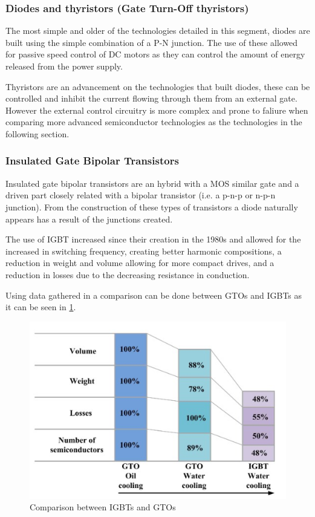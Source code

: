 \subsubsection{Diodes and thyristors (Gate Turn-Off thyristors)}
The most simple and older of the technologies detailed in this segment, diodes are built using the simple combination of a P-N junction. The use of these allowed for passive speed control of DC motors as they can control the amount of energy released from the power supply.

Thyristors are an advancement on the technologies that built diodes, these can be controlled and inhibit the current flowing through them from an external gate. However the external control circuitry is more complex and prone to faliure when comparing more advanced semiconductor technologies as the technologies in the following section.
\subsubsection{Insulated Gate Bipolar Transistors}
Insulated gate bipolar transistors are an hybrid with a MOS similar gate and a driven part closely related with a bipolar transistor (i.e. a p-n-p or n-p-n junction). From the construction of these types of transistors a diode naturally appears has a result of the junctions created. 

The use of IGBT increased since their creation in the 1980s and allowed for the increased in switching frequency, creating better harmonic compositions, a reduction in weight and volume allowing for more compact drives, and a reduction in losses due to the decreasing resistance in conduction. 

Using data gathered in \cite{MainSOTA} a comparison can be done between GTOs and IGBTs as it can be seen in \ref{fig:GTOvIGBT}.

\begin{figure}[h]
    \centering
    \includegraphics{Figures/IGBTvGTO.jpg}
    \caption{Comparison between IGBTs and GTOs \cite{MainSOTA}}
    \label{fig:GTOvIGBT}
\end{figure}

